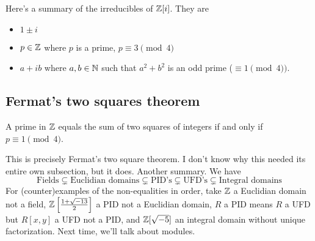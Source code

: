 \orbreak
Here's a summary of the irreducibles of $\mathbb{Z}[i]$. They are 
\begin{itemize}
    \item $1\pm i$ 
    \item $p\in \mathbb{Z}$ where $p$ is a prime, $p\equiv 3\pmod 4$
    \item $a+ib$ where $a,b\in \mathbb{N}$ such that $a^2+b^2$ is an odd prime ($\equiv 1 \pmod 4)$.
\end{itemize}
\subsection{Fermat's two squares theorem}
\begin{cor}
    A prime in $\mathbb{Z}$ equals the sum of two squares of integers if and only if $p\equiv 1\pmod 4$.
\end{cor}
This is precisely Fermat's two square theorem. I don't know why this needed its entire own subsection, but it does.
\orbreak
Another summary. We have \[
\text{Fields}  \subsetneq  \text{Euclidian domains}  \subsetneq  \text{PID's} \subsetneq \text{UFD's} \subsetneq \text{Integral domains} 
\] For (counter)examples of the non-equalities in order, take $\mathbb{Z}$ a Euclidian domain not a field, $\mathbb{Z}\left[ \frac{1+\sqrt{-13} }{2} \right] $ a PID not a Euclidian domain, $R$ a  PID means $R$ a UFD but $R[x,y]$ a UFD not a PID, and $\mathbb{Z}[\sqrt{-5} ]$ an integral domain without unique factorization. Next time, we'll talk about modules.
